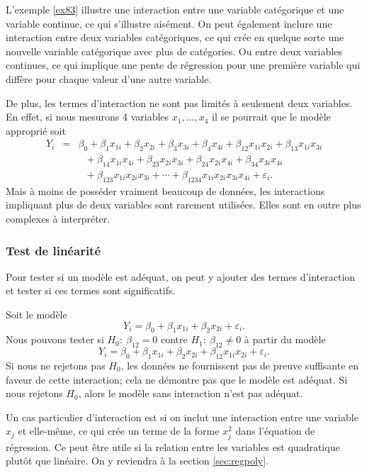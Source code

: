 L'exemple \ref{ex83} illustre une interaction entre une variable catégorique et une variable continue, ce qui s'illustre aisément. On peut également inclure une interaction entre deux variables catégoriques, ce qui crée en quelque sorte une nouvelle variable catégorique avec plus de catégories. Ou entre deux variables continues, ce qui implique une pente de régression pour une première variable qui diffère pour chaque valeur d'une autre variable.

De plus, les termes d'interaction ne sont pas limités à seulement deux variables. En effet, si nous mesurons 4 variables $x_1,\ldots,x_4$
il se pourrait que le modèle approprié soit
\begin{eqnarray*}
Y_i&=&\beta_0+\beta_1x_{1i}+\beta_2x_{2i}+\beta_3x_{3i}+\beta_4x_{4i}+
\beta_{12}x_{1i}x_{2i}+\beta_{13}x_{1i}x_{3i}\\
&\ &\ \ \ +\beta_{14}x_{1i}x_{4i}+\beta_{23}x_{2i}x_{3i}+
\beta_{24}x_{2i}x_{4i}+\beta_{34}x_{3i}x_{4i}\\
&\ &\ \ \ +\beta_{123}
x_{1i}x_{2i}x_{3i}+\cdots+\beta_{1234}x_{1i}x_{2i}x_{3i}x_{4i}
+\varepsilon_i.\end{eqnarray*} Mais à moins de posséder vraiment beaucoup
de données, les interactions impliquant plus de deux variables
sont rarement utilisées. Elles sont en outre plus complexes à interpréter.


\subsubsection*{Test de linéarité}

Pour tester si un modèle est adéquat, on peut y ajouter des
termes d'interaction et tester si ces termes sont significatifs.
\begin{exemple}
Soit le modèle
$$Y_i=\beta_0+\beta_1x_{1i}+\beta_2x_{2i}+\varepsilon_i.$$ Nous pouvons tester si
$H_0:\ \beta_{12}=0$ contre $H_1:\ \beta_{12}\neq0$ à partir du
modèle
$$Y_i=\beta_0+\beta_1x_{1i}+\beta_2x_{2i}+\beta_{12}x_{1i}x_{2i}+\varepsilon_i.$$
Si nous ne rejetons pas $H_0$, les données ne fournissent pas de preuve suffisante en faveur de cette interaction; cela ne démontre pas que le modèle est adéquat. Si nous rejetons $H_0$, alors le
modèle sans interaction n'est pas adéquat.\\
\end{exemple}

\begin{remarque}
Un cas particulier d'interaction est si on inclut une interaction entre une variable $x_j$ et elle-même, ce qui crée un terme de la forme $x_j^2$ dans l'équation de régression. Ce peut être utile si la relation entre les variables est quadratique plutôt que linéaire. On y reviendra à la section \ref{sec:regpoly}.
\end{remarque} 